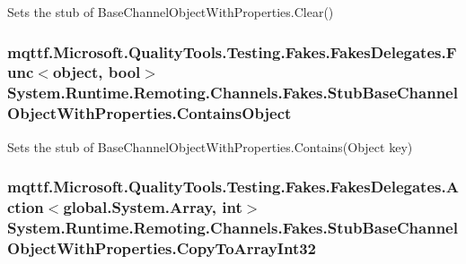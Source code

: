 Sets the stub of Base\-Channel\-Object\-With\-Properties.\-Clear()

\hypertarget{class_system_1_1_runtime_1_1_remoting_1_1_channels_1_1_fakes_1_1_stub_base_channel_object_with_properties_a9c8d27f2d67ef34283ce0e9af1c8bf0f}{
\subsubsection[{Contains\-Object}]{\setlength{\rightskip}{0pt plus 5cm}mqttf.\-Microsoft.\-Quality\-Tools.\-Testing.\-Fakes.\-Fakes\-Delegates.\-Func$<$object, bool$>$ System.\-Runtime.\-Remoting.\-Channels.\-Fakes.\-Stub\-Base\-Channel\-Object\-With\-Properties.\-Contains\-Object}}\label{class_system_1_1_runtime_1_1_remoting_1_1_channels_1_1_fakes_1_1_stub_base_channel_object_with_properties_a9c8d27f2d67ef34283ce0e9af1c8bf0f}


Sets the stub of Base\-Channel\-Object\-With\-Properties.\-Contains(\-Object key)

\hypertarget{class_system_1_1_runtime_1_1_remoting_1_1_channels_1_1_fakes_1_1_stub_base_channel_object_with_properties_af01ca2ec58df69c974ed3d57a808419c}{
\subsubsection[{Copy\-To\-Array\-Int32}]{\setlength{\rightskip}{0pt plus 5cm}mqttf.\-Microsoft.\-Quality\-Tools.\-Testing.\-Fakes.\-Fakes\-Delegates.\-Action$<$global.\-System.\-Array, int$>$ System.\-Runtime.\-Remoting.\-Channels.\-Fakes.\-Stub\-Base\-Channel\-Object\-With\-Properties.\-Copy\-To\-Array\-Int32}}\label{class_system_1_1_runtime_1_1_remoting_1_1_channels_1_1_fakes_1_1_stub_base_channel_object_with_properties_af01ca2ec58df69c974ed3d57a808419c}


